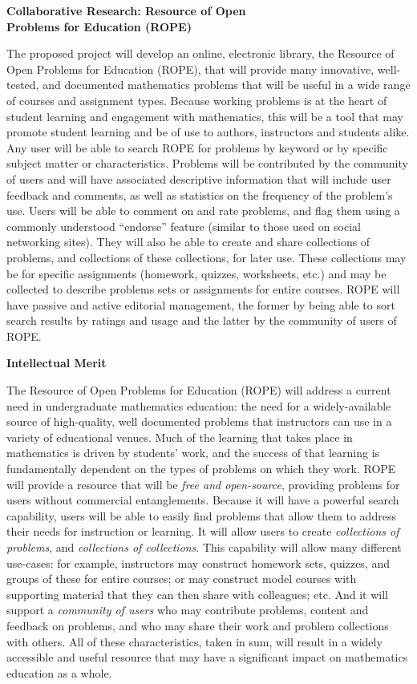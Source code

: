 \documentclass[11pt]{article}
\begin{document}
\begin{center}
{\Large \textbf{Collaborative Research: Resource of Open\\
Problems for Education (ROPE)}}
\end{center}

\bigskip
\noindent
The proposed project will develop an online, electronic library, the
Resource of Open Problems for Education (ROPE), that will provide many
innovative, well-tested, and documented mathematics problems that
will be useful in a wide range of courses and assignment types.  Because
working problems is at the heart of student learning and engagement with
mathematics, this will be a tool that may promote student learning and be
of use to authors, instructors and students alike.  Any user will be able
to search ROPE for problems by keyword or by specific subject matter or
characteristics.  Problems will be contributed by the community of users
and will have associated descriptive information that will include user
feedback and comments, as well as statistics on the frequency of the
problem's use.  Users will be able to comment on and rate problems, and
flag them using a commonly understood ``endorse'' feature (similar to
those used on social networking sites).  They will also be able to create
and share collections of problems, and collections of these collections,
for later use.  These collections may be for specific assignments
(homework, quizzes, worksheets, etc.) and may be collected to describe
problems sets or assignments for entire courses.  ROPE will have passive
and active editorial management, the former by being able to sort search
results by ratings and usage and the latter by the community of users of
ROPE.

\bigskip\bigskip
\noindent
{\large \textbf{Intellectual Merit}}

The Resource of Open Problems for Education (ROPE) will address a current
need in undergraduate mathematics education: the need for a
widely-available source of high-quality, well documented problems that
instructors can use in a variety of educational venues.  Much of the
learning that takes place in mathematics is driven by students' work, and
the success of that learning is fundamentally dependent on the types of
problems on which they work.  ROPE will provide a resource that will be
\emph{free and open-source}, providing problems for users without
commercial entanglements.  Because it will have a powerful search
capability, users will be able to easily find problems that allow them to
address their needs for instruction or learning.  It will allow users to
create \emph{collections of problems}, and \emph{collections of
collections}.  This capability will allow many different use-cases: for
example, instructors may construct homework sets, quizzes, and groups of
these for entire courses; or may construct model courses with supporting
material that they can then share with colleagues; etc.  And it will
support a \emph{community of users} who may contribute problems, content
and feedback on problems, and who may share their work and problem
collections with others.  All of these characteristics, taken in sum, will
result in a widely accessible and useful resource that may have a
significant impact on mathematics education as a whole.
\end{document}
